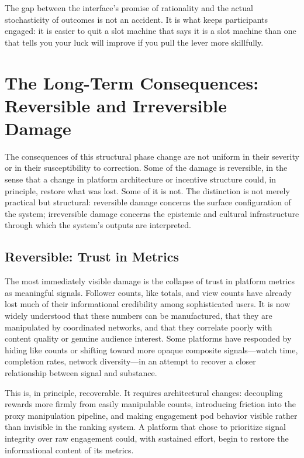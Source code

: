 \documentclass[12pt, a4paper]{article}
\begin{document}
The gap between the interface's promise of rationality and the actual stochasticity of outcomes is not an accident. It is what keeps participants engaged: it is easier to quit a slot machine that says it is a slot machine than one that tells you your luck will improve if you pull the lever more skillfully.

\section{The Long-Term Consequences: Reversible and Irreversible Damage}

The consequences of this structural phase change are not uniform in their severity or in their susceptibility to correction. Some of the damage is reversible, in the sense that a change in platform architecture or incentive structure could, in principle, restore what was lost. Some of it is not. The distinction is not merely practical but structural: reversible damage concerns the surface configuration of the system; irreversible damage concerns the epistemic and cultural infrastructure through which the system's outputs are interpreted.

\subsection{Reversible: Trust in Metrics}

The most immediately visible damage is the collapse of trust in platform metrics as meaningful signals. Follower counts, like totals, and view counts have already lost much of their informational credibility among sophisticated users. It is now widely understood that these numbers can be manufactured, that they are manipulated by coordinated networks, and that they correlate poorly with content quality or genuine audience interest. Some platforms have responded by hiding like counts or shifting toward more opaque composite signals---watch time, completion rates, network diversity---in an attempt to recover a closer relationship between signal and substance.

This is, in principle, recoverable. It requires architectural changes: decoupling rewards more firmly from easily manipulable counts, introducing friction into the proxy manipulation pipeline, and making engagement pod behavior visible rather than invisible in the ranking system. A platform that chose to prioritize signal integrity over raw engagement could, with sustained effort, begin to restore the informational content of its metrics.
\end{document}
